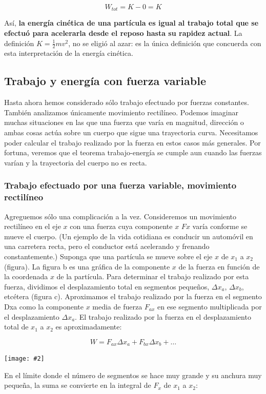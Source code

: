 \documentclass{article}
\newcommand{\newsubsection}[1]{
    \vspace{0.5cm}
    \color{sectionColor}
    \subsection{\bl{#1}}
    \color{black}
    \vspace{0.5cm}
}
\newcommand{\newtitle}[1]{
    \color{titleColor}
    \subsubsection{#1}
    \color{black}
}
\newcommand{\bl}[1]{\textbf{#1}}
\newcommand{\ladoALado}[4]{
    \begin{minipage}[t]{#3\textwidth}
        \vspace{0pt}
        #1
    \end{minipage}
    \hfill
    \begin{minipage}[t]{#4\textwidth}
        \vspace{0pt}
        \centering
        \texttt{[image: \#2]}
    \end{minipage}
}
\begin{document}
    \[ W_{tot} = K - 0 = K \]

    \par Así, \bl{la energía cinética de una partícula es igual al trabajo total que se efectuó para acelerarla desde el reposo hasta su rapidez actual}. La definición $K = \frac{1}{2}mv^2$, no se eligió al azar: es la única definición que concuerda con esta interpretación de la energía cinética.

    \newsubsection{Trabajo y energía con fuerza variable}

    \par Hasta ahora hemos considerado sólo trabajo efectuado por fuerzas constantes. También analizamos únicamente movimiento rectilíneo. Podemos imaginar muchas situaciones en las que una fuerza que varía en magnitud, dirección o ambas cosas actúa sobre un cuerpo que sigue una trayectoria curva. Necesitamos poder calcular el trabajo realizado por la fuerza en estos casos más generales. Por fortuna, veremos que el teorema trabajo-energía se cumple aun cuando las fuerzas varían y la trayectoria del cuerpo no es recta.

    \newtitle{Trabajo efectuado por una fuerza variable,
movimiento rectilíneo}

    \ladoALado{
        \par Agreguemos sólo una complicación a la vez. Consideremos un movimiento rectilíneo en el eje $x$ con una fuerza cuya componente $x$ $Fx$ varía conforme se mueve el cuerpo. (Un ejemplo de la vida cotidiana es conducir un automóvil en una carretera recta, pero el conductor está acelerando y frenando constantemente.) Suponga que una partícula se mueve sobre el eje $x$ de $x_1$ a $x_2$ (figura). La figura b es una gráfica de la componente $x$ de la fuerza en función de la coordenada $x$ de la partícula. Para determinar el trabajo realizado por esta fuerza, dividimos el desplazamiento total en segmentos pequeños, $\Delta x_a$, $\Delta x_b$, etcétera (figura c). Aproximamos el trabajo realizado por la fuerza en el segmento Dxa como la componente $x$ media de fuerza $F_{ax}$ en ese segmento multiplicada por el desplazamiento $\Delta x_a$.  El trabajo realizado por la fuerza en el desplazamiento total de $x_1$ a $x_2$ es aproximadamente:

        \[ W = F_{ax} \Delta x_a + F_{bx} \Delta x_b + \ldots \]

    }{img/5.3-1.png}{0.5}{0.5}

    \par En el límite donde el número de segmentos se hace muy grande y su anchura muy pequeña, la suma se convierte en la integral de $F_x$ de $x_1$ a $x_2$:
\end{document}
